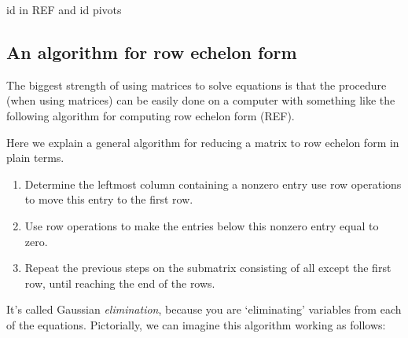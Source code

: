 \documentclass{ximera}
\begin{document}
\begin{question}
  id in REF and id pivots
\end{question}



\subsection{An algorithm for row echelon form}

The biggest strength of using matrices to solve equations is that the
procedure (when using matrices) can be easily done on a computer with
something like the following algorithm for computing row echelon form
(REF).

\begin{algorithm}
  Here we explain a general algorithm for reducing a matrix to row
  echelon form in plain terms.
  \begin{enumerate}
  \item Determine the leftmost column containing a nonzero entry use
    row operations to move this entry to the first row.
  \item Use row operations to make the entries below this nonzero entry equal to zero.
  \item Repeat the previous steps on the submatrix consisting of all
    except the first row, until reaching the end of the rows.
  \end{enumerate}
\end{algorithm}

It's called Gaussian \textit{elimination}, because you are
`eliminating' variables from each of the equations.  Pictorially, we
can imagine this algorithm working as follows:
\end{document}
